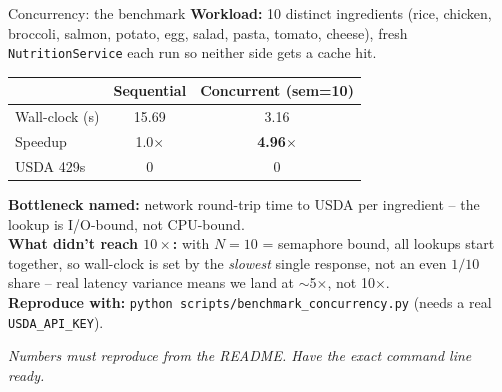 \documentclass[aspectratio=169,11pt]{beamer}
\begin{document}
\begin{frame}{Concurrency: the benchmark}
  \textbf{Workload:} 10 distinct ingredients (rice, chicken, broccoli, salmon, potato, egg, salad, pasta, tomato, cheese), fresh \texttt{NutritionService} each run so neither side gets a cache hit.

  \vspace{0.4em}
  \begin{center}\small
  \begin{tabular}{lcc}
    \toprule
    & \textbf{Sequential} & \textbf{Concurrent (sem=10)} \\
    \midrule
    Wall-clock (s) & 15.69 & 3.16 \\
    Speedup        & 1.0$\times$ & \textbf{4.96$\times$} \\
    USDA 429s      & 0  & 0 \\
    \bottomrule
  \end{tabular}
  \end{center}

  \vspace{0.4em}
  \textbf{Bottleneck named:} network round-trip time to USDA per ingredient -- the lookup is I/O-bound, not CPU-bound.\\
  \textbf{What didn't reach $10\times$:} with $N=10$ = semaphore bound, all lookups start together, so wall-clock is set by the \emph{slowest} single response, not an even $1/10$ share -- real latency variance means we land at $\sim$5$\times$, not 10$\times$.\\
  \textbf{Reproduce with:} \texttt{python scripts/benchmark\_concurrency.py} (needs a real \texttt{USDA\_API\_KEY}).

  \vspace{0.3em}
  {\footnotesize\textit{Numbers must reproduce from the README. Have the exact command line ready.}}
\end{frame}
\end{document}
